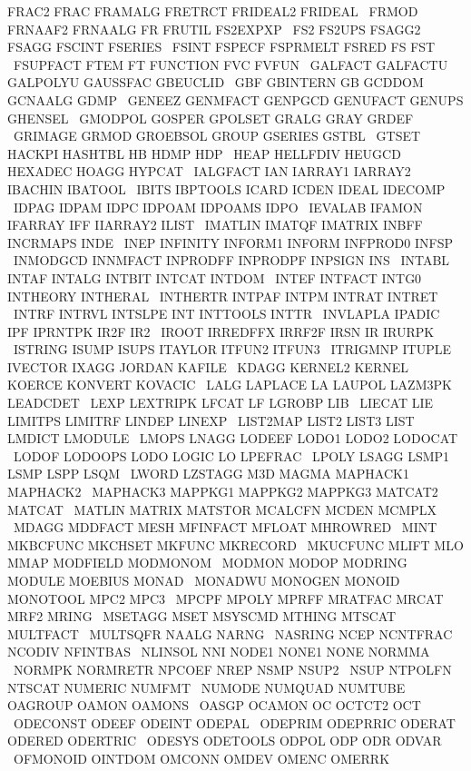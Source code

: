 \documentclass{article}
\begin{document}
     FRAC2 FRAC FRAMALG FRETRCT FRIDEAL2 FRIDEAL \
     FRMOD FRNAAF2 FRNAALG FR FRUTIL FS2EXPXP \
     FS2 FS2UPS FSAGG2 FSAGG FSCINT FSERIES \
     FSINT FSPECF FSPRMELT FSRED FS FST \
     FSUPFACT FTEM FT FUNCTION FVC FVFUN \
     GALFACT GALFACTU GALPOLYU GAUSSFAC GBEUCLID \
     GBF GBINTERN GB GCDDOM GCNAALG GDMP \
     GENEEZ GENMFACT GENPGCD GENUFACT GENUPS GHENSEL \
     GMODPOL GOSPER GPOLSET GRALG GRAY GRDEF \
     GRIMAGE GRMOD GROEBSOL GROUP GSERIES GSTBL \
     GTSET HACKPI HASHTBL HB HDMP HDP \
     HEAP HELLFDIV HEUGCD HEXADEC HOAGG HYPCAT \
     IALGFACT IAN IARRAY1 IARRAY2 IBACHIN IBATOOL \
     IBITS IBPTOOLS ICARD ICDEN IDEAL IDECOMP \
     IDPAG IDPAM IDPC IDPOAM IDPOAMS IDPO \
     IEVALAB IFAMON IFARRAY IFF IIARRAY2 ILIST \
     IMATLIN IMATQF IMATRIX INBFF INCRMAPS INDE \
     INEP INFINITY INFORM1 INFORM INFPROD0 INFSP \
     INMODGCD INNMFACT INPRODFF INPRODPF INPSIGN INS \
     INTABL INTAF INTALG INTBIT INTCAT INTDOM \
     INTEF INTFACT INTG0 INTHEORY INTHERAL \
     INTHERTR INTPAF INTPM INTRAT INTRET \
     INTRF INTRVL INTSLPE INT INTTOOLS INTTR \
     INVLAPLA IPADIC IPF IPRNTPK IR2F IR2 \
     IROOT IRREDFFX IRRF2F IRSN IR IRURPK \
     ISTRING ISUMP ISUPS ITAYLOR ITFUN2 ITFUN3 \
     ITRIGMNP ITUPLE IVECTOR IXAGG JORDAN KAFILE \
     KDAGG KERNEL2 KERNEL KOERCE KONVERT KOVACIC \
     LALG LAPLACE LA LAUPOL LAZM3PK LEADCDET \
     LEXP LEXTRIPK LFCAT LF LGROBP LIB \
     LIECAT LIE LIMITPS LIMITRF LINDEP LINEXP \
     LIST2MAP LIST2 LIST3 LIST LMDICT LMODULE \
     LMOPS LNAGG LODEEF LODO1 LODO2 LODOCAT \
     LODOF LODOOPS LODO LOGIC LO LPEFRAC \
     LPOLY LSAGG LSMP1 LSMP LSPP LSQM \
     LWORD LZSTAGG M3D MAGMA MAPHACK1 MAPHACK2 \
     MAPHACK3 MAPPKG1 MAPPKG2 MAPPKG3 MATCAT2 MATCAT \
     MATLIN MATRIX MATSTOR MCALCFN MCDEN MCMPLX \
     MDAGG MDDFACT MESH MFINFACT MFLOAT MHROWRED \
     MINT MKBCFUNC MKCHSET MKFUNC MKRECORD \
     MKUCFUNC MLIFT MLO MMAP MODFIELD MODMONOM \
     MODMON MODOP MODRING MODULE MOEBIUS MONAD \
     MONADWU MONOGEN MONOID MONOTOOL MPC2 MPC3 \
     MPCPF MPOLY MPRFF MRATFAC MRCAT MRF2 MRING \
     MSETAGG MSET MSYSCMD MTHING MTSCAT MULTFACT \
     MULTSQFR NAALG NARNG \
     NASRING NCEP NCNTFRAC NCODIV NFINTBAS \
     NLINSOL NNI NODE1 NONE1 NONE NORMMA \
     NORMPK NORMRETR NPCOEF NREP NSMP NSUP2 \
     NSUP NTPOLFN NTSCAT NUMERIC NUMFMT \
     NUMODE NUMQUAD NUMTUBE OAGROUP OAMON OAMONS \
     OASGP OCAMON OC OCTCT2 OCT \
     ODECONST ODEEF ODEINT ODEPAL \
     ODEPRIM ODEPRRIC ODERAT ODERED ODERTRIC \
     ODESYS ODETOOLS ODPOL ODP ODR ODVAR \
     OFMONOID OINTDOM OMCONN OMDEV OMENC OMERRK \
\end{document}
